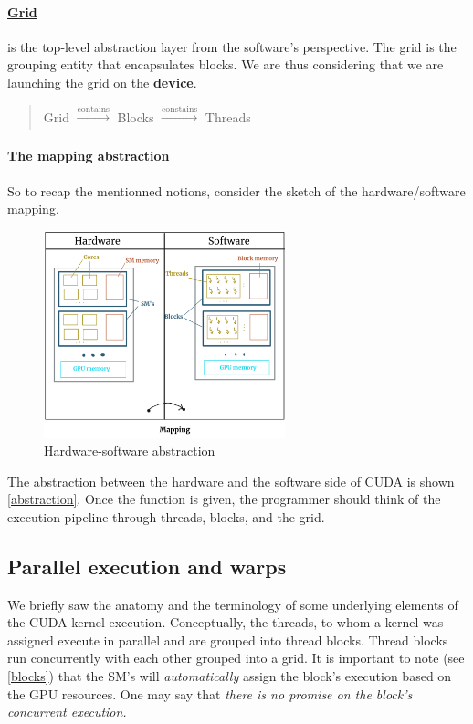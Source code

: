 \documentclass[12pt]{article}
\begin{document}
\vspace{-15pt}
\paragraph{\underline{Grid}} is the top-level abstraction layer from the software's perspective. The grid
is the grouping entity that encapsulates blocks. We are thus considering that we are launching 
the grid on the \textbf{device}.
\begin{quote}
   \centering
   Grid $\xrightarrow[]{\text{contains}}$ Blocks $\xrightarrow[]{\text{constains}}$ Threads
\end{quote}

\vspace{-18pt}
\paragraph{The mapping abstraction} So to recap the mentionned notions, consider the 
sketch of the hardware/software mapping.

\begin{figure}
      \vspace{-10pt}
      \centering
       \includegraphics[height=6cm]{pngs/hard_soft.png}
   \caption{Hardware-software abstraction}
   \label{abstraction}
\end{figure}
The abstraction between the hardware and the software side of CUDA is shown \autoref{abstraction}. Once the function 
is given, the programmer should think of the execution pipeline through threads, blocks, and the grid.

\clearpage
\newpage
\subsection{Parallel execution and warps}
\label{warps}
We briefly saw the anatomy and the terminology of some underlying elements of the CUDA kernel execution.
Conceptually, the threads, to whom a kernel was assigned execute in parallel and are grouped into thread blocks.
Thread blocks run concurrently with each other grouped into a grid. It is important to note (see \autoref{blocks}) that 
the SM's will \textit{automatically} assign the block's execution based on the GPU resources. One may say that 
\textsl{
there is no promise on the block's concurrent execution.
}
\end{document}
